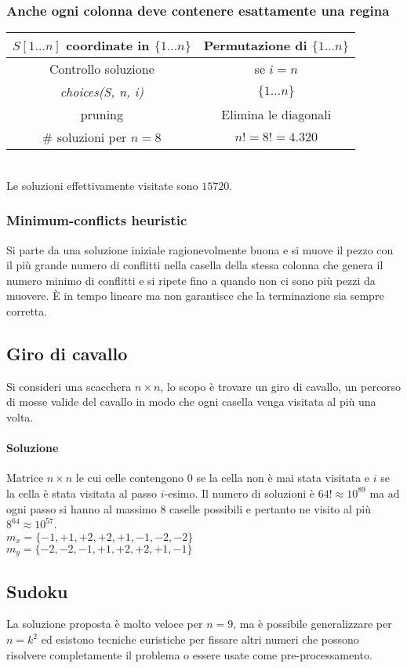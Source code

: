 \subsubsection{Anche ogni colonna deve contenere esattamente una regina}
\begin{tabular}{|c|c|}
	\hline
	$S[1\dots n]$ coordinate in $\{1\dots n\}$ & Permutazione di $\{1\dots n\}$\\
	\hline
	Controllo soluzione & se $i = n$ \\
	\hline
	\emph{choices(S, n, i)} & $\{1\dots n\}$\\
	\hline
	pruning & Elimina le diagonali\\
	\hline
	$\#$ soluzioni per $n=8$ & $n! = 8! = 4.320$\\
	\hline
\end{tabular}\\
Le soluzioni effettivamente visitate sono $15720$.
\subsubsection{Minimum-conflicts heuristic}
Si parte da una soluzione iniziale ragionevolmente buona e si muove il pezzo con il pi\`u grande numero di conflitti nella casella della stessa colonna che genera il numero minimo di 
conflitti e si ripete fino a quando non ci sono pi\`u pezzi da muovere. \`E in tempo lineare ma non garantisce che la terminazione sia sempre corretta.\\

\subsection{Giro di cavallo}
Si consideri una scacchera $n\times n$, lo scopo \`e trovare un giro di cavallo, un percorso di mosse valide del cavallo in modo che ogni casella venga visitata al pi\`u una volta.
\paragraph{Soluzione}
Matrice $n\times n$ le cui celle contengono $0$ se la cella non \`e mai stata visitata e $i$ se la cella \`e stata visitata al passo $i$-esimo. Il numero di soluzioni \`e 
$64!\approx 10^{89}$ ma ad ogni passo si hanno al massimo $8$ caselle possibili e pertanto ne visito al pi\`u $8^{64}\approx 10^{57}$.\\




$m_x = \{-1, +1, +2, +2, +1, -1, -2, -2\}$\\
$m_y = \{-2, -2, -1, +1, +2, +2, +1, -1\}$
\newpage
\subsection{Sudoku}
La soluzione proposta \`e molto veloce per $n=9$, ma \`e possibile generalizzare per $n=k^2$ ed esistono tecniche euristiche per fissare altri numeri che possono risolvere completamente
il problema o essere usate come pre-processamento.
\begin{multicols}{2}

\columnbreak

\end{multicols}


